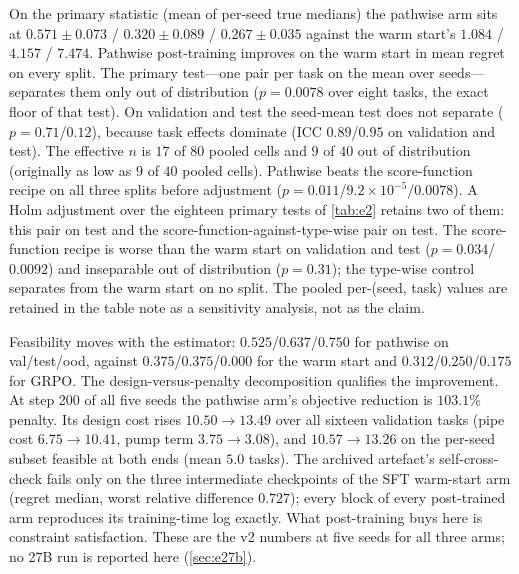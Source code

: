 \documentclass[journal]{IEEEtran}
\begin{document}
On the primary statistic (mean of per-seed true medians) the pathwise arm sits at
$0.571\pm0.073$ / $0.320\pm0.089$ / $0.267\pm0.035$ against the warm start's
$1.084$ / $4.157$ / $7.474$.  Pathwise post-training improves on the warm start in
mean regret on every split. The primary test---one pair per task on the mean over seeds---separates them
only out of distribution ($p=0.0078$ over eight tasks, the exact floor of that
test).  On validation and test the seed-mean test does not separate
($p=0.71$/$0.12$), because task effects dominate (ICC $0.89$/$0.95$ on validation and test).  The effective $n$ is $17$ of $80$ pooled cells and $9$ of $40$
out of distribution (originally as low as $9$ of $40$ pooled cells).  Pathwise beats
the score-function recipe on all three splits before adjustment
($p=0.011$/$9.2\times10^{-5}$/$0.0078$).  A Holm adjustment over the eighteen
primary tests of \cref{tab:e2} retains two of them: this pair on test and the
score-function-against-type-wise pair on test.  The score-function recipe is
worse than the warm start on validation and test ($p=0.034$/$0.0092$) and
inseparable out of distribution ($p=0.31$); the type-wise control separates from
the warm start on no split.  The pooled per-(seed, task) values are retained in
the table note as a sensitivity analysis, not as the claim.

Feasibility moves with the estimator: $0.525$/$0.637$/$0.750$ for pathwise on
val/test/ood, against $0.375$/$0.375$/$0.000$ for the warm start and
$0.312$/$0.250$/$0.175$ for GRPO.  The design-versus-penalty decomposition
qualifies the improvement.  At step 200 of all five seeds the pathwise arm's objective reduction is
$103.1\%$ penalty. Its design cost rises $10.50\to13.49$ over all sixteen validation
tasks (pipe cost $6.75\to10.41$, pump term $3.75\to3.08$), and $10.57\to13.26$ on the
per-seed subset feasible at both ends (mean $5.0$ tasks).  The archived artefact's
self-cross-check fails only on the three intermediate checkpoints of the SFT
warm-start arm (regret median, worst relative difference $0.727$); every block of
every post-trained arm reproduces its training-time log exactly.  What
post-training buys here is constraint satisfaction.  These are the v2 numbers at five seeds for all
three arms; no 27B run is reported here (\cref{sec:e27b}).
\end{document}
